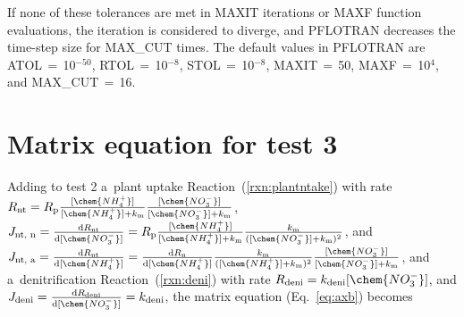 \documentclass[gmd,noline]{copernicus}
\begin{document}
      If none of these tolerances are met in MAXIT iterations or MAXF
      function evaluations, the iteration is considered to diverge, and
      PFLOTRAN decreases the time-step size for MAX\_CUT times. The default
      values in PFLOTRAN are ATOL\,$=$\,10$^{-50}$, RTOL\,$=$\,10$^{-8}$,
      STOL\,$=$\,10$^{-8}$, MAXIT\,$=$\,50, MAXF\,$=$\,10$^4$, and
      MAX\_CUT\,$=$\,16.



\section{Matrix equation for test 3}%
\label{sec:eqtest3}

      Adding to test 2 a~plant  uptake Reaction~(\ref{rxn:plantntake}) with rate
$R_{\text{nt}}=R_\mathrm{p}\frac{[\chem{NH_4^+}]}{[\chem{NH_4^+}] +
k_\mathrm{m}}\frac{[\chem{NO_3^-}]}{[\chem{NO_3^-}] + k_\mathrm{m}}$,
$J_{\text{nt, n}}=\frac{\mathrm{d} R_{\text{nt}}}{\mathrm{d} [\chem{NO_3^-}]} = R_\mathrm{p}\frac{[\chem{NH_4^+}]}{[\chem{NH_4^+}] + k_\mathrm{m}}\frac{k_\mathrm{m}}{([\chem{NO_3^-}] + k_\mathrm{m})^2}$, and
$J_{\text{nt, a}} = \frac{\mathrm{d} R_{\text{nt}}}{\mathrm{d} [\chem{NH_4^+}]} =
\frac{\mathrm{d} R_\mathrm{n}}{\mathrm{d} [\chem{NH_4^+}]} \frac{k_\mathrm{m}}{([\chem{NH_4^+}] + k_\mathrm{m})^2}\frac{[\chem{NO_3^-}]}{[\chem{NO_3^-}] + k_\mathrm{m}}$,
and a~denitrification Reaction~(\ref{rxn:deni}) with rate $R_{\text{deni}}=k_{\text{deni}} [\chem{NO_3^-}]$,
and $J_{\text{deni}} = \frac{\mathrm{d} R_{\text{deni}}}{\mathrm{d} [\chem{NO_3^-}]}=k_{\text{deni}}$,
the matrix equation (Eq.~\ref{eq:axb}) becomes
\end{document}
